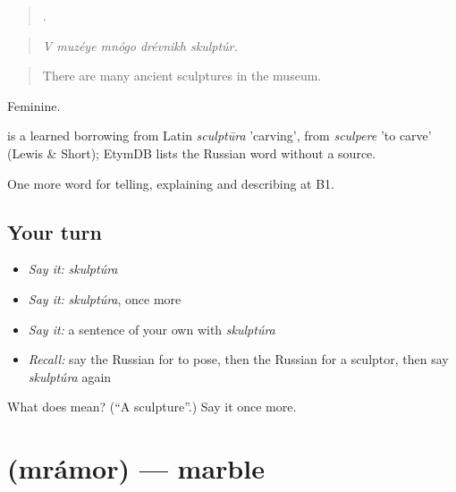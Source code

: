 \begin{quote}
    .
\end{quote}

\begin{quote}
\emph{V muzéye mnógo drévnikh skulptúr.}
\end{quote}

\begin{quote}
There are many ancient sculptures in the museum.
\end{quote}

Feminine.

\begin{cousinweb}
\emph{} is a learned borrowing from Latin \emph{sculptūra} 'carving', from \emph{sculpere} 'to carve' (Lewis \& Short); EtymDB lists the Russian word without a source.
\end{cousinweb}

\begin{grammarlens}[title={What you've built}]
One more word for telling, explaining and describing at B1.
\end{grammarlens}

\subsection*{Your turn}
\begin{itemize}
\raggedright
  \item \emph{Say it:} \emph{skulptúra}
  \item \emph{Say it:} \emph{skulptúra}, once more
  \item \emph{Say it:} a sentence of your own with \emph{skulptúra}
  \item \emph{Recall:} say the Russian for to pose, then the Russian for a sculptor, then say \emph{skulptúra} again
\end{itemize}

\begin{tcolorbox}[breakable,colback=teal!4,colframe=teal!35!black,title={Before you move on}]
What does  mean? (\textquotedblleft{}A sculpture\textquotedblright{}.) Say it once more.
\end{tcolorbox}
\section[\texorpdfstring{\ru{мрамор} (mrámor)}{мрамор (mrámor)}]{ (mrámor) — marble}

\label{lesson:RU-C522-mramor}



